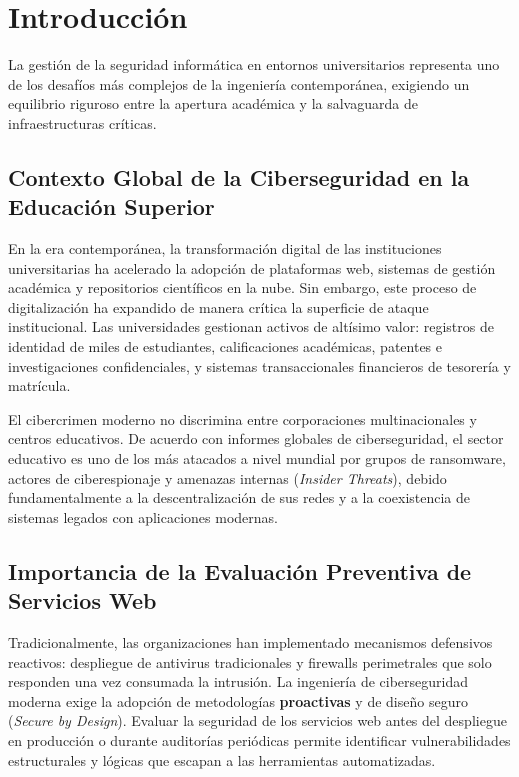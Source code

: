 \chapter{Introducción}
\label{ch:introduccion}

La gestión de la seguridad informática en entornos universitarios representa uno de los desafíos más complejos de la ingeniería contemporánea, exigiendo un equilibrio riguroso entre la apertura académica y la salvaguarda de infraestructuras críticas.

\section{Contexto Global de la Ciberseguridad en la Educación Superior}
En la era contemporánea, la transformación digital de las instituciones universitarias ha acelerado la adopción de plataformas web, sistemas de gestión académica y repositorios científicos en la nube. Sin embargo, este proceso de digitalización ha expandido de manera crítica la superficie de ataque institucional. Las universidades gestionan activos de altísimo valor: registros de identidad de miles de estudiantes, calificaciones académicas, patentes e investigaciones confidenciales, y sistemas transaccionales financieros de tesorería y matrícula.

El cibercrimen moderno no discrimina entre corporaciones multinacionales y centros educativos. De acuerdo con informes globales de ciberseguridad, el sector educativo es uno de los más atacados a nivel mundial por grupos de ransomware, actores de ciberespionaje y amenazas internas (\textit{Insider Threats}), debido fundamentalmente a la descentralización de sus redes y a la coexistencia de sistemas legados con aplicaciones modernas.

\section{Importancia de la Evaluación Preventiva de Servicios Web}
Tradicionalmente, las organizaciones han implementado mecanismos defensivos reactivos: despliegue de antivirus tradicionales y firewalls perimetrales que solo responden una vez consumada la intrusión. La ingeniería de ciberseguridad moderna exige la adopción de metodologías \textbf{proactivas} y de diseño seguro (\textit{Secure by Design}). Evaluar la seguridad de los servicios web antes del despliegue en producción o durante auditorías periódicas permite identificar vulnerabilidades estructurales y lógicas que escapan a las herramientas automatizadas.

